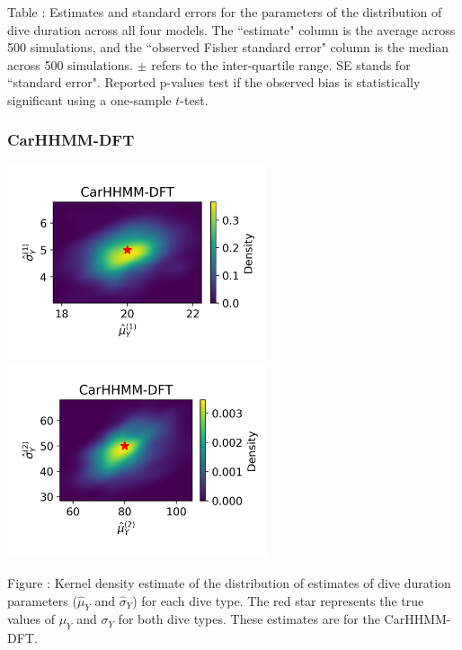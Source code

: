 \documentclass{article}
\begin{document}
        \noindent Table : Estimates and standard errors for the parameters of the distribution of dive duration across all four models. The ``estimate" column is the average across 500 simulations, and the ``observed Fisher standard error" column is the median across 500 simulations. $\pm$ refers to the inter-quartile range. SE stands for ``standard error". Reported p-values test if the observed bias is statistically significant using a one-sample $t$-test.
        \addtocounter{tablenum}{1}
        
        \subsubsection{CarHHMM-DFT}
        \begin{center}
        \includegraphics[width=3in]{../Plots/hhmm_FV_MLE_density_dive_duration_-1_0.png}
        \includegraphics[width=3in]{../Plots/hhmm_FV_MLE_density_dive_duration_-1_1.png}
        \end{center}
        
        \noindent Figure : Kernel density estimate of the distribution of estimates of dive duration parameters ($\hat \mu_Y$ and $\hat \sigma_Y$) for each dive type. The red star represents the true values of $\mu_Y$ and $\sigma_Y$ for both dive types. These estimates are for the CarHHMM-DFT.
        \addtocounter{fignum}{1}
        
\end{document}
